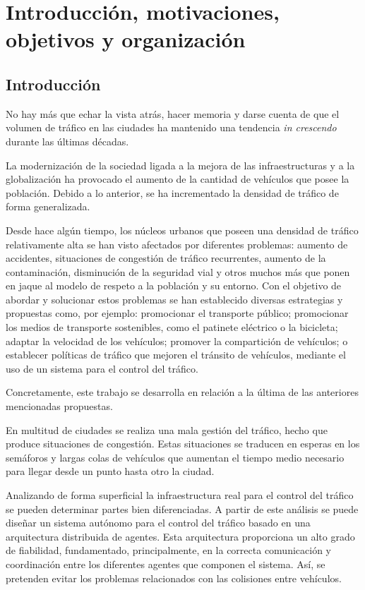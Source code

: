 \chapter{Introducción, motivaciones, objetivos y organización}
    \label{chap:one}

\section{Introducción}
No hay más que echar la vista atrás, hacer memoria y darse cuenta de que el volumen de tráfico en las ciudades ha mantenido una tendencia \textit{in crescendo} durante las últimas décadas. 

La modernización de la sociedad ligada a la mejora de las infraestructuras y a la globalización ha provocado el aumento de la cantidad de vehículos que posee la población. Debido a lo anterior, se ha incrementado la densidad de tráfico de forma generalizada. 

Desde hace algún tiempo, los núcleos urbanos que poseen una densidad de tráfico relativamente alta se han visto afectados por diferentes problemas: aumento de accidentes, situaciones de congestión de tráfico recurrentes, aumento de la contaminación, disminución de la seguridad vial y otros muchos más que ponen en jaque al modelo de respeto a la población y su entorno. Con el objetivo de abordar y solucionar estos problemas se han establecido diversas estrategias y propuestas como, por ejemplo: promocionar el transporte público; promocionar los medios de transporte sostenibles, como el patinete eléctrico o la bicicleta; adaptar la velocidad de los vehículos; promover la compartición de vehículos; o establecer políticas de tráfico que mejoren el tránsito de vehículos, mediante el uso de un sistema para el control del tráfico.

Concretamente, este trabajo se desarrolla en relación a la última de las anteriores mencionadas propuestas.

En multitud de ciudades se realiza una mala gestión del tráfico, hecho que produce situaciones de congestión. Estas situaciones se traducen en esperas en los semáforos y largas colas de vehículos que aumentan el tiempo medio necesario para llegar desde un punto hasta otro la ciudad.

Analizando de forma superficial la infraestructura real para el control del tráfico se pueden determinar partes bien diferenciadas. A partir de este análisis se puede diseñar un sistema autónomo para el control del tráfico basado en una arquitectura distribuida de agentes. Esta arquitectura proporciona un alto grado de fiabilidad, fundamentado, principalmente, en la correcta comunicación y coordinación entre los diferentes agentes que componen el sistema. Así, se pretenden evitar los problemas relacionados con las colisiones entre vehículos.


